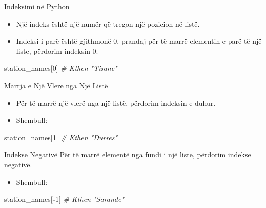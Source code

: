\documentclass[
  ignorenonframetext,
]{beamer}
\newenvironment{Shaded}{\begin{snugshade}}{\end{snugshade}}
\newcommand{\CommentTok}[1]{\textcolor[rgb]{0.56,0.35,0.01}{\textit{#1}}}
\newcommand{\DecValTok}[1]{\textcolor[rgb]{0.00,0.00,0.81}{#1}}
\newcommand{\NormalTok}[1]{#1}
\newcommand{\OperatorTok}[1]{\textcolor[rgb]{0.81,0.36,0.00}{\textbf{#1}}}
\providecommand{\tightlist}{%
  \setlength{\itemsep}{0pt}\setlength{\parskip}{0pt}}
\begin{document}
\begin{frame}[fragile]{Indeksimi në Python}
\protect\hypertarget{indeksimi-nuxeb-python}{}
\begin{itemize}
\item
  Një indeks është një numër që tregon një pozicion në listë.
\item
  Indeksi i parë është gjithmonë 0, prandaj për të marrë elementin e
  parë të një liste, përdorim indeksin 0.
\end{itemize}

\begin{Shaded}
\begin{Highlighting}[]
\NormalTok{  station\_names[}\DecValTok{0}\NormalTok{]  }\CommentTok{\# Kthen "Tirane"}
\end{Highlighting}
\end{Shaded}
\end{frame}

\begin{frame}[fragile]{Marrja e Një Vlere nga Një Listë}
\protect\hypertarget{marrja-e-njuxeb-vlere-nga-njuxeb-listuxeb}{}
\begin{itemize}
\item
  Për të marrë një vlerë nga një listë, përdorim indeksin e duhur.
\item
  Shembull:
\end{itemize}

\begin{Shaded}
\begin{Highlighting}[]
\NormalTok{station\_names[}\DecValTok{1}\NormalTok{]  }\CommentTok{\# Kthen "Durres"}
\end{Highlighting}
\end{Shaded}
\end{frame}

\begin{frame}[fragile]{Indekse Negativë}
\protect\hypertarget{indekse-negativuxeb}{}
Për të marrë elementë nga fundi i një liste, përdorim indekse negativë.

\begin{itemize}
\tightlist
\item
  Shembull:
\end{itemize}

\begin{Shaded}
\begin{Highlighting}[]
\NormalTok{  station\_names[}\OperatorTok{{-}}\DecValTok{1}\NormalTok{]  }\CommentTok{\# Kthen "Sarande"}
\end{Highlighting}
\end{Shaded}
\end{frame}
\end{document}
